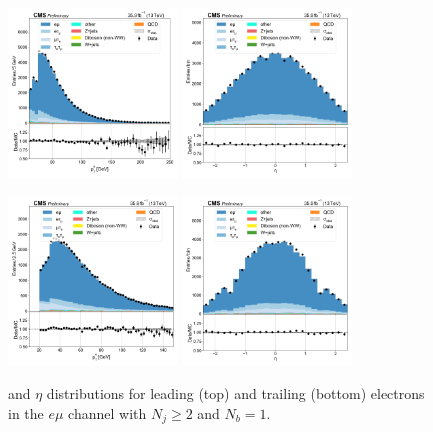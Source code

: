 \begin{figure}[htb!]
    \centering
    \includegraphics[width=0.4\textwidth]{chapters/Analysis/sectionPlots/figures/data_mc_overlays/emu_2016_cat_gt2_gt2_a_signal_linear_lepton_lepton1_pt}
    \includegraphics[width=0.4\textwidth]{chapters/Analysis/sectionPlots/figures/data_mc_overlays/emu_2016_cat_gt2_gt2_a_signal_linear_lepton_lepton1_eta}

    \includegraphics[width=0.4\textwidth]{chapters/Analysis/sectionPlots/figures/data_mc_overlays/emu_2016_cat_gt2_gt2_a_signal_linear_lepton_lepton2_pt}
    \includegraphics[width=0.4\textwidth]{chapters/Analysis/sectionPlots/figures/data_mc_overlays/emu_2016_cat_gt2_gt2_a_signal_linear_lepton_lepton2_eta}
    \caption{\pt and $\eta$ distributions for leading (top) and trailing
        (bottom) electrons in the $e\mu$ channel with $N_{j} \geq 2$ and
        $N_{b} = 1$.}
    \label{fig:analysis:plots:emu_6_kinematic}
\end{figure}

